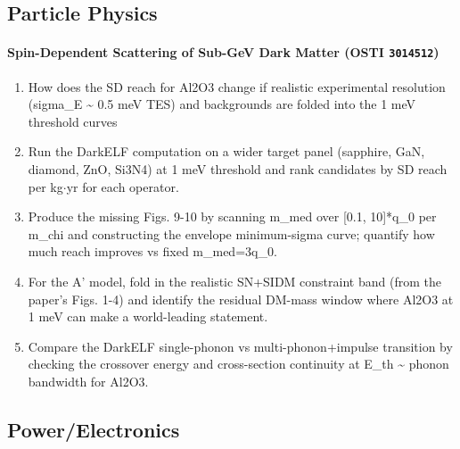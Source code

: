 \subsection*{Particle Physics}
\paragraph{Spin-Dependent Scattering of Sub-GeV Dark Matter \textnormal{\small(OSTI \texttt{3014512})}}
\begin{enumerate}[leftmargin=1.6em,itemsep=0.2em,topsep=0.2em,label=Q\arabic*.]
\item How does the SD reach for Al2O3 change if realistic experimental resolution (sigma\_E \textasciitilde{} 0.5 meV TES) and backgrounds are folded into the 1 meV threshold curves
\item Run the DarkELF computation on a wider target panel (sapphire, GaN, diamond, ZnO, Si3N4) at 1 meV threshold and rank candidates by SD reach per kg$\cdot$yr for each operator.
\item Produce the missing Figs. 9-10 by scanning m\_med over [0.1, 10]*q\_0 per m\_chi and constructing the envelope minimum-sigma curve; quantify how much reach improves vs fixed m\_med=3q\_0.
\item For the A' model, fold in the realistic SN+SIDM constraint band (from the paper's Figs. 1-4) and identify the residual DM-mass window where Al2O3 at 1 meV can make a world-leading statement.
\item Compare the DarkELF single-phonon vs multi-phonon+impulse transition by checking the crossover energy and cross-section continuity at E\_th \textasciitilde{} phonon bandwidth for Al2O3.
\end{enumerate}
\subsection*{Power/Electronics}
